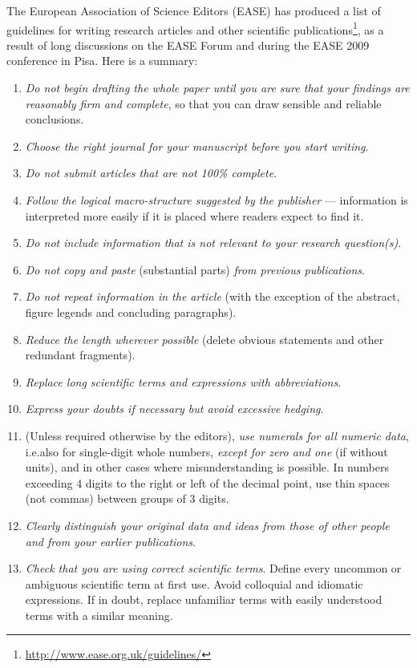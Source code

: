 \documentclass[graybox,envcountchap,sectrefs,UStrade]{svmono}
\begin{document}
The European Association of Science Editors (EASE) has produced a list of guidelines for writing research articles and other scientific publications\footnote{\url{http://www.ease.org.uk/guidelines/}}, as a result of long discussions on the EASE Forum and during the EASE 2009 conference in Pisa. Here is a summary:\label{sec:EASEguidelines}

\begin{enumerate}
  \item \emph{Do not begin drafting the whole paper until you are sure that your findings are reasonably firm and complete}, so that you can draw sensible and reliable conclusions.
  \item \emph{Choose the right journal for your manuscript before you start writing}.
  \item \emph{Do not submit articles that are not 100\% complete}.
  \item \emph{Follow the logical macro-structure suggested by the publisher} --- information is interpreted more easily if it is placed where readers expect to find it.
  \item \emph{Do not include information that is not relevant to your research question(s)}.
  \item \emph{Do not copy and paste} (substantial parts) \emph{from previous publications}.
  \item \emph{Do not repeat information in the article} (with the exception of the abstract, figure legends and concluding paragraphs).
  \item \emph{Reduce the length wherever possible} (delete obvious statements and other redundant fragments).
  \item \emph{Replace long scientific terms and expressions with abbreviations}.
  \item \emph{Express your doubts if necessary but avoid excessive hedging}.
  \item (Unless required otherwise by the editors), \emph{use numerals for all numeric data}, i.e.\@ also for single-digit whole numbers, \emph{except for zero and one} (if without units), and in other cases where misunderstanding is possible. In numbers exceeding 4 digits to the right or left of the decimal point, use thin spaces (not commas) between groups of 3 digits.
  \item \emph{Clearly distinguish your original data and ideas from those of other people and from your earlier publications}.
  \item \emph{Check that you are using correct scientific terms}. Define every uncommon or ambiguous scientific term at first use. Avoid colloquial and idiomatic expressions. If in doubt, replace unfamiliar terms with easily understood terms with a similar meaning.

\end{enumerate}
\end{document}
